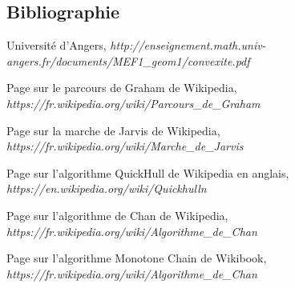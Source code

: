 \documentclass[final]{beamer}
\begin{document}
\begin{frame}[t]
\begin{multicols}{3}


\subsection{Bibliographie}

\begin{thebibliography}{99}
 Université d'Angers, \textit{http://enseignement.math.univ-angers.fr/documents/MEF1_geom1/convexite.pdf}

 Page sur le parcours de Graham de Wikipedia, \textit{https://fr.wikipedia.org/wiki/Parcours_de_Graham}

 Page sur la marche de Jarvis de Wikipedia, \textit{https://fr.wikipedia.org/wiki/Marche_de_Jarvis}

 Page sur l'algorithme QuickHull de Wikipedia en anglais, \textit{https://en.wikipedia.org/wiki/Quickhulln}

 Page sur l'algorithme de Chan de Wikipedia, \textit{https://fr.wikipedia.org/wiki/Algorithme_de_Chan}

 Page sur l'algorithme Monotone Chain de Wikibook, \textit{https://fr.wikipedia.org/wiki/Algorithme_de_Chan}


\end{thebibliography}

\end{multicols}

\end{frame}
\end{document}
